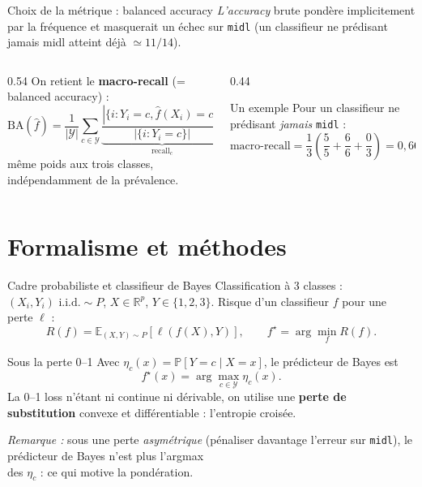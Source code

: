 \documentclass[aspectratio=169, 10pt]{beamer}
\begin{document}
\begin{frame}{Choix de la métrique : balanced accuracy}
  \textit{L’accuracy} brute pondère implicitement par la fréquence et masquerait un échec sur \texttt{midl} (un classifieur ne prédisant jamais midl atteint déjà $\simeq 11/14$).

  \medskip
  \begin{columns}[c]
    \begin{column}{0.54\textwidth}
      On retient le \textbf{macro-recall} (= balanced accuracy) :
      \[
        \text{BA}(\hat{f}) = \frac{1}{|\mathcal{Y}|} \sum_{c \in \mathcal{Y}} \underbrace{\frac{|\{i : Y_i = c, \hat{f}(X_i) = c\}|}{|\{i : Y_i = c\}|}}_{\text{recall}_c}
      \]
      même poids aux trois classes, indépendamment de la prévalence.
    \end{column}

    \begin{column}{0.44\textwidth}
      \begin{alertblock}{Un exemple}
        Pour un classifieur ne prédisant \textit{jamais} \texttt{midl} :
        \[
          \text{macro-recall} = \frac{1}{3}\left(\frac{5}{5} + \frac{6}{6} + \frac{0}{3}\right) = 0{,}667
        \]
      \end{alertblock}
    \end{column}
  \end{columns}
\end{frame}

\section{Formalisme et méthodes}

\begin{frame}{Cadre probabiliste et classifieur de Bayes}
  \vspace{7pt}
  Classification à 3 classes : $(X_i, Y_i) \text{ i.i.d.} \sim P$, $X \in \mathbb{R}^p$, $Y \in \{1, 2, 3\}$. Risque d’un classifieur $f$ pour une perte $\ell$ :
  \[
    R(f) = \mathbb{E}_{(X,Y)\sim P}[\ell(f(X), Y)], \qquad f^\star = \arg\min_f R(f).
  \]

  \bigskip
  \begin{block}{Sous la perte 0--1}
    Avec $\eta_c(x) = \mathbb{P}[Y = c \mid X = x]$, le prédicteur de Bayes est
    \[
      f^\star(x) = \arg\max_{c \in \mathcal{Y}} \eta_c(x).
    \]
    La 0--1 loss n’étant ni continue ni dérivable, on utilise une \textbf{perte de substitution} convexe et différentiable : l’entropie croisée.
  \end{block}

  \bigskip
  \textit{Remarque :} sous une perte \textit{asymétrique} (pénaliser davantage l’erreur sur \texttt{midl}), le prédicteur de Bayes n’est plus l’argmax \\
  des $\eta_c$ : ce qui motive la pondération.
\end{frame}
\end{document}
